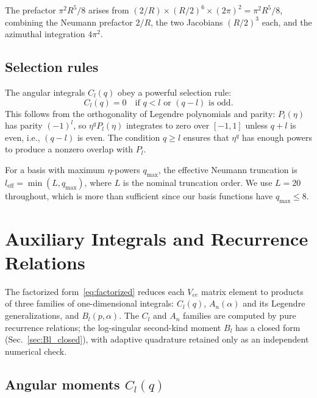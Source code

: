 \documentclass[aps,pra,twocolumn,superscriptaddress,longbibliography]{revtex4-2}
\begin{document}
The prefactor $\pi^2 R^5/8$ arises from
$(2/R) \times (R/2)^6 \times (2\pi)^2 = \pi^2 R^5/8$,
combining the Neumann prefactor $2/R$, the two Jacobians
$(R/2)^3$ each, and the azimuthal integration $4\pi^2$.

\subsection{Selection rules}

The angular integrals $C_l(q)$ obey a powerful selection rule:
\begin{equation}
  C_l(q) = 0 \quad\text{if } q < l \text{ or } (q - l)
  \text{ is odd}.
  \label{eq:selection_rule}
\end{equation}
This follows from the orthogonality of Legendre polynomials
and parity: $P_l(\eta)$ has parity $(-1)^l$, so
$\eta^q P_l(\eta)$ integrates to zero over $[-1,1]$ unless
$q + l$ is even, i.e., $(q - l)$ is even.  The condition
$q \geq l$ ensures that $\eta^q$ has enough powers to produce
a nonzero overlap with $P_l$.

For a basis with maximum $\eta$-powers $q_{\max}$, the
effective Neumann truncation is $l_{\mathrm{eff}} =
\min(L, q_{\max})$, where $L$ is the nominal truncation
order.  We use $L = 20$ throughout, which is more than
sufficient since our basis functions have $q_{\max} \leq 8$.


\section{Auxiliary Integrals and Recurrence Relations}
\label{sec:auxiliary}

The factorized form~\eqref{eq:factorized} reduces each
$V_{ee}$ matrix element to products of three families of
one-dimensional integrals: $C_l(q)$, $A_n(\alpha)$ and
its Legendre generalizations, and $B_l(p, \alpha)$.  The
$C_l$ and $A_n$ families are computed by pure recurrence
relations; the log-singular second-kind moment $B_l$ has a
closed form (Sec.~\ref{sec:Bl_closed}), with adaptive quadrature
retained only as an independent numerical check.

\subsection{Angular moments \texorpdfstring{$C_l(q)$}{Cl(q)}}
\end{document}

